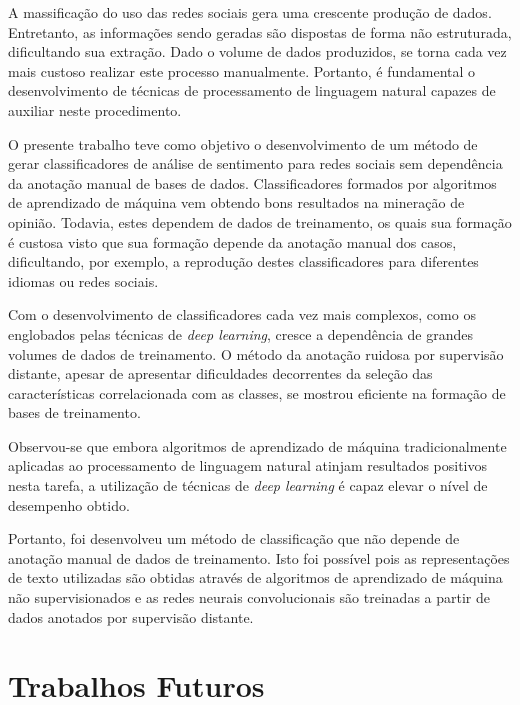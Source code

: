 A massificação do uso das redes sociais gera uma crescente produção de dados.
Entretanto, as informações sendo geradas são dispostas de forma não estruturada, dificultando sua extração.
Dado o volume de dados produzidos, se torna cada vez mais custoso realizar este processo manualmente.
Portanto, é fundamental o desenvolvimento de técnicas de processamento de linguagem natural capazes de auxiliar neste
procedimento.

O presente trabalho teve como objetivo o desenvolvimento de um método de gerar classificadores de análise de sentimento
para redes sociais sem dependência da anotação manual de bases de dados.
Classificadores formados por algoritmos de aprendizado de máquina vem obtendo bons resultados na mineração de opinião.
Todavia, estes dependem de dados de treinamento, os quais sua formação é custosa visto que sua formação depende da
anotação manual dos casos, dificultando, por exemplo, a reprodução destes classificadores para diferentes idiomas ou
redes sociais.

Com o desenvolvimento de classificadores cada vez mais complexos, como os englobados pelas técnicas de
\textit{deep learning}, cresce a dependência de grandes volumes de dados de treinamento.
O método da anotação ruidosa por supervisão distante, apesar de apresentar dificuldades decorrentes da seleção das
características correlacionada com as classes, se mostrou eficiente na formação de bases de treinamento.

Observou-se que embora algoritmos de aprendizado de máquina tradicionalmente aplicadas ao processamento de linguagem
natural atinjam resultados positivos nesta tarefa, a utilização de técnicas de \textit{deep learning} é capaz elevar o
nível de desempenho obtido.

Portanto, foi desenvolveu um método de classificação que não depende de anotação manual de dados de treinamento.
Isto foi possível pois as representações de texto utilizadas são obtidas através de algoritmos de aprendizado de máquina
não supervisionados e as redes neurais convolucionais são treinadas a partir de dados anotados por supervisão distante.

\section{Trabalhos Futuros}

